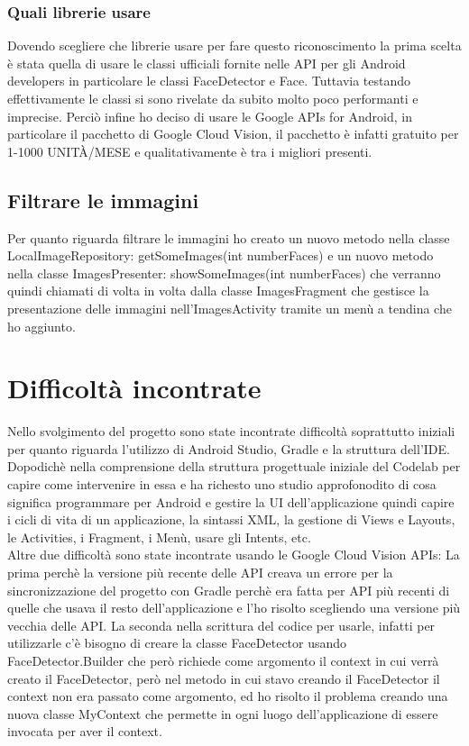 \documentclass{article}
\begin{document}
\subsubsection{Quali librerie usare}
Dovendo scegliere che librerie usare per fare questo riconoscimento la prima scelta è stata quella di usare le classi ufficiali fornite nelle API per gli Android developers in particolare le classi FaceDetector e Face. Tuttavia testando effettivamente le classi si sono rivelate da subito molto poco performanti e imprecise.
Perciò infine ho deciso di usare le Google APIs for Android, in particolare il pacchetto di Google Cloud Vision, il pacchetto è infatti gratuito per 1-1000 UNITÀ/MESE e qualitativamente è tra i migliori presenti.
\subsection{Filtrare le immagini}
Per quanto riguarda filtrare le immagini ho creato un nuovo metodo nella classe LocalImageRepository: getSomeImages(int numberFaces) e un nuovo metodo nella classe ImagesPresenter: showSomeImages(int numberFaces) che verranno quindi chiamati di volta in volta dalla classe ImagesFragment che gestisce la presentazione delle immagini nell'ImagesActivity tramite un menù a tendina che ho aggiunto.
\newpage
\section{Difficoltà incontrate}
Nello svolgimento del progetto sono state incontrate difficoltà soprattutto iniziali per quanto riguarda l'utilizzo di Android Studio, Gradle e la struttura dell'IDE. Dopodichè nella comprensione della struttura progettuale iniziale del Codelab per capire come intervenire in essa e ha richesto uno studio approfonodito di cosa significa programmare per Android e gestire la UI dell'applicazione quindi capire i cicli di vita di un applicazione, la sintassi XML, la gestione di Views e Layouts, le Activities, i Fragment, i Menù, usare gli Intents, etc.\\
Altre due difficoltà sono state incontrate usando le Google Cloud Vision APIs: La prima perchè la versione più recente delle API creava un errore per la sincronizzazione del progetto con Gradle perchè era fatta per API più recenti di quelle che usava il resto dell'applicazione e l'ho risolto scegliendo una versione più vecchia delle API. La seconda nella scrittura del codice per usarle, infatti per utilizzarle c'è bisogno di creare la classe FaceDetector usando FaceDetector.Builder che però richiede come argomento il context in cui verrà creato il FaceDetector, però nel metodo in cui stavo creando il FaceDetector il context non era passato come argomento, ed ho risolto il problema creando una nuova classe MyContext che permette in ogni luogo dell'applicazione di essere invocata per aver il context.
\end{document}
